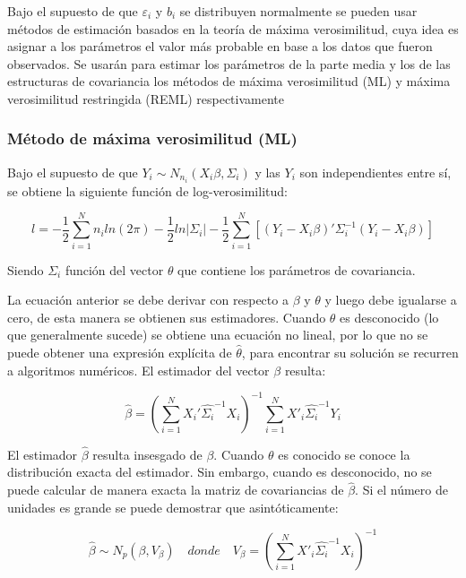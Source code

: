 \documentclass[spanish]{article}
\numberwithin{figure}{subsection}
\numberwithin{equation}{subsection}
\numberwithin{table}{subsection}
\begin{document}
Bajo el supuesto de que $\varepsilon_i$ y $b_i$ se distribuyen normalmente se
pueden usar métodos de estimación basados en la teoría de máxima verosimilitud,
cuya idea es asignar a los parámetros el valor más probable en base a los datos
que fueron observados. Se usarán para estimar los parámetros de la parte media
y los de las estructuras de covariancia los métodos de máxima verosimilitud
(ML) y máxima verosimilitud restringida (REML) respectivamente

\subsubsection{Método de máxima verosimilitud (ML)}

Bajo el supuesto de que $Y_i \sim N_{n_i}(X_i\beta, \varSigma_i)$ y las $Y_i$
son independientes entre sí, se obtiene la siguiente función de
log-verosimilitud:

\begin{equation}
\label{ML}
	l = -\frac{1}{2} \sum_{i=1}^{N}n_i ln(2\pi) - \frac{1}{2}ln|\varSigma_i| -
	\frac{1}{2} \sum_{i=1}^{N} [(Y_i - X_i\beta)'
	\varSigma_i^{-1} (Y_i - X_i\beta)]
\end{equation}

Siendo $\varSigma_i$ función del vector $\theta$ que contiene los parámetros de
covariancia.

La ecuación anterior se debe derivar con respecto a $\beta$ y $\theta$ y luego
debe igualarse a cero, de esta manera se obtienen sus estimadores. Cuando
$\theta$ es desconocido (lo que generalmente sucede) se obtiene una ecuación no
lineal, por lo que no se puede obtener una expresión explícita de
$\hat{\theta}$, para encontrar su solución se recurren a algoritmos numéricos.
El estimador del vector $\beta$ resulta:

\[ \hat{\beta} = (\sum_{i=1}^{N} X_i'\hat{\varSigma_i}^{-1}X_i)^{-1}
\sum_{i=1}^{N} X'_i\hat{\varSigma_i}^{-1}Y_i \]

El estimador $\hat{\beta}$ resulta insesgado de $\beta$. Cuando $\theta$ es
conocido se conoce la distribución exacta del estimador. Sin embargo, cuando es
desconocido, no se puede calcular de manera exacta la matriz de covariancias de
$\hat{\beta}$. Si el número de unidades es grande se puede demostrar que
asintóticamente:

\[ \hat{\beta} \sim N_p(\beta, V_{\beta}) \quad donde \quad V_{\beta} =
(\sum_{i=1}^{N} X'_i\hat{\varSigma_i}^{-1}X_i)^{-1} \]

\end{document}
